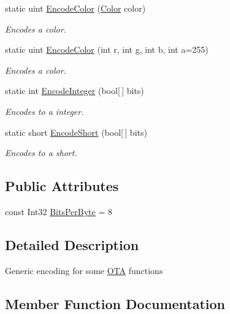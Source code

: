 \begin{DoxyCompactItemize}
static uint \hyperlink{classOTA_1_1Tools_1_1Encoding_ae5d18c04b92a960ccfe094c9f9567e3c}{Encode\+Color} (\hyperlink{structMicrosoft_1_1Xna_1_1Framework_1_1Color}{Color} color)
\begin{DoxyCompactList}\small\item\em Encodes a color. \end{DoxyCompactList}\item 
static uint \hyperlink{classOTA_1_1Tools_1_1Encoding_a25c03602ca00ccd03bb4aa6301e76c01}{Encode\+Color} (int r, int g, int b, int a=255)
\begin{DoxyCompactList}\small\item\em Encodes a color. \end{DoxyCompactList}\item 
static int \hyperlink{classOTA_1_1Tools_1_1Encoding_a7e969d3d49b57b53462727f6a76dc01e}{Encode\+Integer} (bool\mbox{[}$\,$\mbox{]} bits)
\begin{DoxyCompactList}\small\item\em Encodes to a integer. \end{DoxyCompactList}\item 
static short \hyperlink{classOTA_1_1Tools_1_1Encoding_ae83a962d73513e2bde060dd5423aa1a1}{Encode\+Short} (bool\mbox{[}$\,$\mbox{]} bits)
\begin{DoxyCompactList}\small\item\em Encodes to a short. \end{DoxyCompactList}\end{DoxyCompactItemize}
\subsection*{Public Attributes}
\begin{DoxyCompactItemize}
\item 
const Int32 \hyperlink{classOTA_1_1Tools_1_1Encoding_ad09f6dfa359e0d53207585cb4e692f55}{Bits\+Per\+Byte} = 8
\end{DoxyCompactItemize}


\subsection{Detailed Description}
Generic encoding for some \hyperlink{namespaceOTA}{O\+T\+A} functions 



\subsection{Member Function Documentation}
\hypertarget{classOTA_1_1Tools_1_1Encoding_ab578f400eed000c11f435cbf2c70bf36}{}
